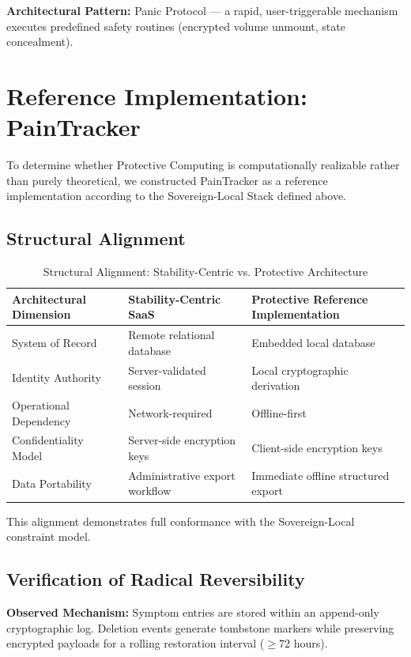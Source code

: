 \documentclass[acmsmall,review]{acmart}
\begin{document}
\textbf{Architectural Pattern:} Panic Protocol --- a rapid, user-triggerable mechanism executes predefined safety routines (encrypted volume unmount, state concealment).

\section{Reference Implementation: PainTracker}

To determine whether Protective Computing is computationally realizable rather than purely theoretical, we constructed PainTracker as a reference implementation according to the Sovereign-Local Stack defined above.

\subsection{Structural Alignment}

\begin{table}[h]
\centering
\caption{Structural Alignment: Stability-Centric vs. Protective Architecture}
\label{tab:alignment}
\begin{tabular}{lll}
\toprule
\textbf{Architectural Dimension} & \textbf{Stability-Centric SaaS} & \textbf{Protective Reference Implementation} \\
\midrule
System of Record & Remote relational database & Embedded local database \\
Identity Authority & Server-validated session & Local cryptographic derivation \\
Operational Dependency & Network-required & Offline-first \\
Confidentiality Model & Server-side encryption keys & Client-side encryption keys \\
Data Portability & Administrative export workflow & Immediate offline structured export \\
\bottomrule
\end{tabular}
\end{table}

This alignment demonstrates full conformance with the Sovereign-Local constraint model.

\subsection{Verification of Radical Reversibility}

\textbf{Observed Mechanism:} Symptom entries are stored within an append-only cryptographic log. Deletion events generate tombstone markers while preserving encrypted payloads for a rolling restoration interval ($\ge 72$ hours).
\end{document}
